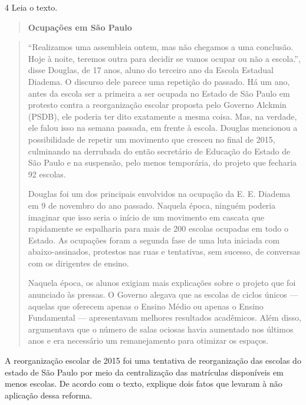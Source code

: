 \num{4} Leia o texto.

\begin{quote}
\textbf{Ocupações em São Paulo}
\end{quote}

\begin{quote}
``Realizamos uma assembleia ontem, mas não chegamos a uma conclusão.
Hoje à noite, teremos outra para decidir se vamos ocupar ou não a
escola.'', disse Douglas, de 17 anos, aluno do terceiro ano da Escola
Estadual Diadema. O discurso dele parece uma repetição do passado. Há um
ano, antes da escola ser a primeira a ser ocupada no Estado de São Paulo
em protesto contra a reorganização escolar proposta pelo Governo Alckmin
(PSDB), ele poderia ter dito exatamente a mesma coisa. Mas, na verdade,
ele falou isso na semana passada, em frente à escola. Douglas mencionou
a possibilidade de repetir um movimento que cresceu no final de 2015,
culminando na derrubada do então secretário de Educação do Estado de São
Paulo e na suspensão, pelo menos temporária, do projeto que fecharia 92
escolas.

Douglas foi um dos principais envolvidos na ocupação da E. E. Diadema em
9 de novembro do ano passado. Naquela época, ninguém poderia imaginar
que isso seria o início de um movimento em cascata que rapidamente se
espalharia para mais de 200 escolas ocupadas em todo o Estado. As
ocupações foram a segunda fase de uma luta iniciada com
abaixo-assinados, protestos nas ruas e tentativas, sem sucesso, de
conversas com os dirigentes de ensino.

Naquela época, os alunos exigiam mais explicações sobre o projeto que
foi anunciado às pressas. O Governo alegava que as escolas de ciclos
únicos --- aquelas que oferecem apenas o Ensino Médio ou apenas o Ensino
Fundamental --- apresentavam melhores resultados acadêmicos. Além disso,
argumentava que o número de salas ociosas havia aumentado nos últimos
anos e era necessário um remanejamento para otimizar os espaços.
\end{quote}


A reorganização escolar de 2015 foi uma tentativa de reorganização das
escolas do estado de São Paulo por meio da centralização das matrículas
disponíveis em menos escolas. De acordo com o texto, explique dois fatos
que levaram à não aplicação dessa reforma.

